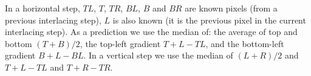 \documentclass{article}
\begin{document}
\label{sec:prediction_interlacing}
In a horizontal step, $TL$, $T$, $TR$, $BL$, $B$ and $BR$ are known pixels (from a previous interlacing step), $L$ is also known
(it is the previous pixel in the current interlacing step).
As a prediction we use the median of: %
the average of top and bottom $(T+B)/2$,
the top-left gradient $T+L-TL$, and
the bottom-left gradient $B+L-BL$.
%
In a vertical step we use the median of
$(L+R)/2$ and
$T+L-TL$ and
$T+R-TR$.
\end{document}
